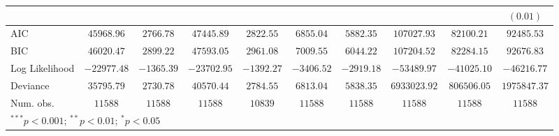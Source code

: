 \begin{tabular}{l c c c c c c c c c}
                    &              &              &               &                &                &                &                &               & $(0.01)$      \\
\midrule
AIC                 & $45968.96$   & $2766.78$    & $47445.89$    & $2822.55$      & $6855.04$      & $5882.35$      & $107027.93$    & $82100.21$    & $92485.53$    \\
BIC                 & $46020.47$   & $2899.22$    & $47593.05$    & $2961.08$      & $7009.55$      & $6044.22$      & $107204.52$    & $82284.15$    & $92676.83$    \\
Log Likelihood      & $-22977.48$  & $-1365.39$   & $-23702.95$   & $-1392.27$     & $-3406.52$     & $-2919.18$     & $-53489.97$    & $-41025.10$   & $-46216.77$   \\
Deviance            & $35795.79$   & $2730.78$    & $40570.44$    & $2784.55$      & $6813.04$      & $5838.35$      & $6933023.92$   & $806506.05$   & $1975847.37$  \\
Num. obs.           & $11588$      & $11588$      & $11588$       & $10839$        & $11588$        & $11588$        & $11588$        & $11588$       & $11588$       \\
\bottomrule
\multicolumn{10}{l}{\scriptsize{$^{***}p<0.001$; $^{**}p<0.01$; $^{*}p<0.05$}}
\end{tabular}
